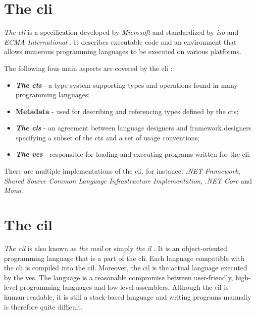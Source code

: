 \documentclass[declaration,shortabstract,english,mgr]{iithesis}
\begin{document}
\section{The \acrlong{cli}}

\textit{The \acrfull{cli}} is a specification developed by \textit{Microsoft} and standardized by \textit{\acrshort{iso}} and \textit{ECMA International} \cite{isoStandard, ecmaStandard}. It describes executable code and an environment that allows numerous programming languages to be executed on various platforms.

The following four main aspects are covered by the \acrlong{cli} \cite{ecmaStandard}:
\begin{itemize}
	\item{
		\textbf{\textit{The \acrfull{cts}}} - a type system supporting types and operations found in many programming languages;
	}
	\item{
		\textbf{Metadata} - used for describing and referencing types defined by the \acrshort{cts};
	}
	\item{
		\textbf{\textit{The \acrfull{cls}}} - an agreement between language designers and framework designers specifying a subset of the \acrshort{cts} and a set of usage conventions;
	}
	\item{
		\textbf{\textit{The \acrfull{ves}}} - responsible for loading and executing programs written for the \acrshort{cli}.
	}
\end{itemize}

There are multiple implementations of the \acrshort{cli}, for instance: \textit{.NET Framework}, \textit{Shared Source Common Language Infrastructure Implementation}, \textit{.NET Core} and \textit{Mono}.

\section{The \acrlong{cil}}

\textit{The \acrfull{cil}} is also known as \textit{the \acrfull{msil}} or simply \textit{the \acrfull{il}} \cite{procsharp7}. It is an object-oriented programming language that is a part of the \acrshort{cli}. Each language compatible with the \acrshort{cli} is compiled into the \acrshort{cil}. Moreover, the \acrshort{cil} is the actual language executed by the \acrshort{ves}. The language is a reasonable compromise between user-friendly, high-level programming languages and low-level assemblers. Although the \acrshort{cil} is human-readable, it is still a stack-based language and writing programs manually is therefore quite difficult.
\end{document}
